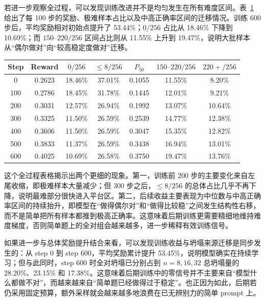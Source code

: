 若进一步观察全过程，可以发现训练改进并不是均匀发生在所有难度区间。表~\ref{tab:training_dynamic_full} 给出了每 100 步的奖励、极难样本占比以及中高正确率区间的迁移情况。训练 600 步后，平均奖励相对初始点提升了 53.44\%；$0/256$ 占比从 18.46\% 下降到 10.69\%；而 $150\text{--}220/256$ 区间占比则从 11.55\% 上升到 19.47\%，说明大批样本从“偶尔做对”向“较高稳定度做对”迁移。

\begin{table}[!htbp]
    \label{tab:training_dynamic_full}
    \centering
    \small
    \begin{tabular}{ccccccc}
        \hline
        Step & Reward & $0/256$ & $\leq 8/256$ & $P_{50}$ & $150\text{--}220/256$ & $220{+}/256$ \\
        \hline
        0 & 0.2623 & 18.46\% & 37.01\% & 0.1055 & 11.55\% & 8.20\% \\
        100 & 0.2786 & 18.45\% & 31.78\% & 0.1445 & 12.01\% & 9.21\% \\
        200 & 0.3031 & 12.57\% & 26.94\% & 0.1992 & 13.07\% & 10.64\% \\
        300 & 0.3325 & 11.50\% & 26.59\% & 0.2539 & 14.77\% & 12.38\% \\
        400 & 0.3606 & 11.50\% & 26.59\% & 0.3047 & 15.35\% & 12.82\% \\
        500 & 0.3833 & 11.37\% & 26.59\% & 0.3438 & 16.94\% & 13.01\% \\
        600 & 0.4025 & 10.69\% & 26.58\% & 0.3750 & 19.47\% & 13.76\% \\
        \hline
    \end{tabular}
\end{table}

这个全过程表格揭示出两个更细的现象。第一，训练前 200 步的主要变化来自左尾收缩，即极难样本大量减少；但 300 步之后，$\leq 8/256$ 的总体占比几乎不再下降，说明最难部分很快进入平台区。第二，后续收益主要表现为中位数与中高正确率区间的持续抬升，即模型在“做得偶尔对”和“做得比较稳”之间发生结构性右移，而不是简单把所有样本都推到极高正确率。这意味着后期训练更需要精细地维持难度梯度，否则简单题上的全对组会越来越多，进一步稀释有效训练信号。

如果进一步与总体奖励提升结合来看，可以发现训练收益与坍塌来源迁移是同步发生的：从 step 0 到 step 600，平均奖励累计提升 53.45\%，说明模型确实在持续学习；但与此同时，step 600 时全对坍塌已分别占到 $n=8,16,32$ 总坍塌量的 28.20\%、23.15\% 和 17.38\%。这意味着后期训练中的零信号并不主要来自“模型什么都做不对”，而越来越来自“简单题已经做得过于稳定”。也正因为如此，后期若仍采用固定预算，额外采样就会越来越多地浪费在已无辨别力的简单 prompt 上。


